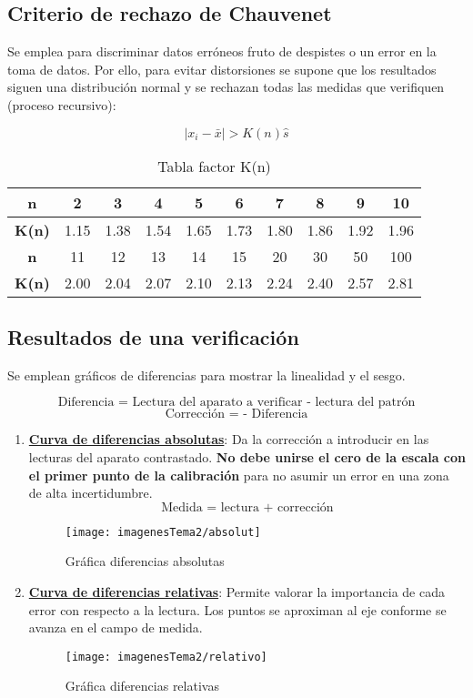 \subsection{Criterio de rechazo de Chauvenet}
Se emplea para discriminar datos erróneos fruto de despistes o un error en la toma de datos. Por ello, para evitar distorsiones se supone que los resultados siguen una distribución normal y se rechazan todas las medidas que verifiquen (proceso recursivo):

\[\lvert x_i - \bar x  \rvert> K(n) \hat{s}\]

\renewcommand{\arraystretch}{1.1} %
\begin{table}[H]
	\centering
	\begin{tabular}{|c|c|c|c|c|c|c|c|c|c|}
		\hline
		\textbf{n} &  2 & 3& 4& 5& 6& 7& 8& 9& 10 \\
		\hline
		\textbf{K(n)} &  1.15 & 1.38& 1.54& 1.65& 1.73& 1.80& 1.86& 1.92&1.96\\
		\hline
		\textbf{n} &11& 12& 13& 14& 15& 20& 30& 50& 100\\
		\hline
		
		\textbf{K(n)} & 2.00& 2.04& 2.07& 2.10& 2.13& 2.24& 2.40& 2.57& 2.81\\
		\hline
	\end{tabular}
	\caption{Tabla factor K(n)}
	\label{tab:example}
\end{table}

\subsection{Resultados de una verificación}
Se emplean gráficos de diferencias para mostrar la linealidad y el sesgo.

\[\text{Diferencia = Lectura del aparato a verificar - lectura del patrón}\]
\[\text{Corrección = - Diferencia}\]
\begin{enumerate}
	\item \underline{\textbf{Curva de diferencias absolutas}}: Da la corrección a introducir en las lecturas del aparato contrastado. \textbf{No debe unirse el cero de la escala con el primer punto de la calibración} para no asumir un error en una zona de alta incertidumbre.
	\[\text{Medida = lectura + corrección}\]
\begin{figure}[H]
	\centering
	\texttt{[image: imagenesTema2/absolut]}
	\caption{Gráfica diferencias absolutas}
	\label{fig:absolut}
\end{figure}
	
	
	\item  \underline{\textbf{Curva de diferencias relativas}}: Permite valorar la importancia de cada error con respecto a la lectura. Los puntos se aproximan al eje conforme se avanza en el campo de medida.


\begin{figure}[H]
	\centering
	\texttt{[image: imagenesTema2/relativo]}
	\caption{Gráfica diferencias relativas}
	\label{fig:relativo}
\end{figure}





\end{enumerate}
